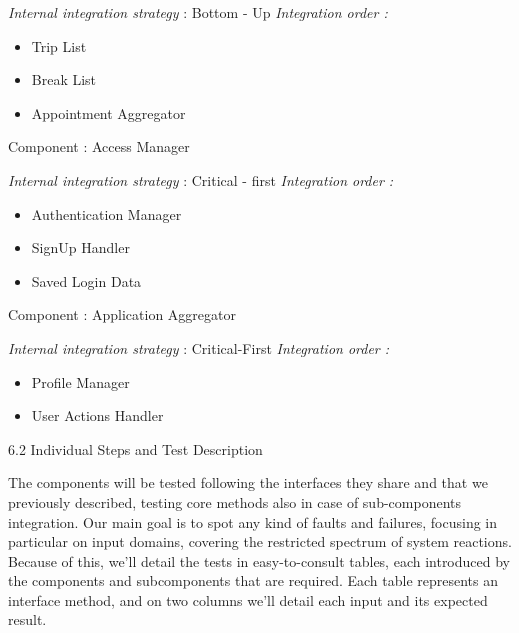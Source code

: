 \textit{Internal integration strategy} : Bottom - Up
\textit{Integration order :}
	\begin{itemize}
		\item Trip List
		\item Break List
		\item Appointment Aggregator
	\end{itemize}

Component : Access Manager

\textit{Internal integration strategy} : Critical - first
\textit{Integration order :}
	\begin{itemize}
		\item Authentication Manager
		\item SignUp Handler
		\item Saved Login Data
	\end{itemize}
		
Component : Application Aggregator

\textit{Internal integration strategy} : Critical-First
\textit{Integration order :}
	\begin{itemize}
		\item Profile Manager
		\item User Actions Handler
\end{itemize}


6.2 Individual Steps and Test Description
 
The components will be tested following the interfaces they share and that we previously described, testing core methods also in case of sub-components integration.
Our main goal is to spot any kind of faults and failures, focusing in particular on input domains, covering the restricted spectrum of system reactions.
Because of this, we'll detail the tests in easy-to-consult tables, each introduced by the components and subcomponents that are required.
Each table represents an interface method, and on two columns we'll detail each input and its expected result.


	

	





	
